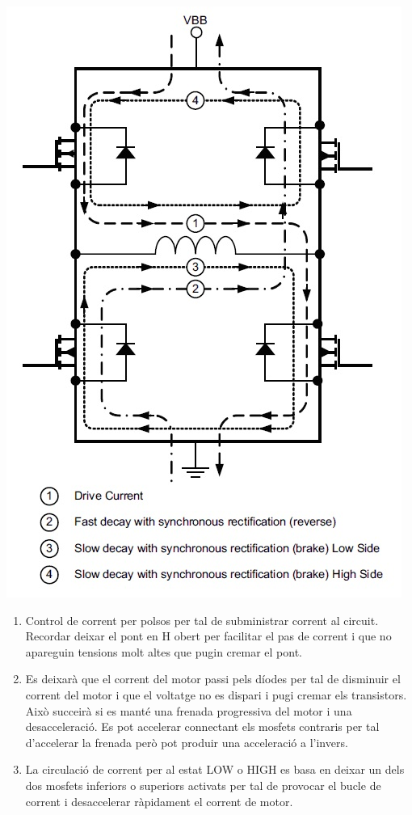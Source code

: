 \includegraphics[width=\textwidth]{Motors/Hsteps}
\bigskip

\begin{enumerate}
    \item Control de corrent per polsos per tal de subministrar corrent al circuit. Recordar deixar el pont en H obert per facilitar el pas de corrent i que no \newline apareguin tensions molt altes que pugin cremar el pont. 
    \item Es deixarà que el corrent del motor passi pels díodes per tal de disminuir el corrent del motor i que el voltatge no es dispari i pugi cremar els transistors. Això succeirà si es manté una frenada progressiva del motor i una desacceleració. Es pot accelerar connectant els mosfets contraris per tal d'accelerar la frenada però pot produir una acceleració a l'invers. 
    \item La circulació de corrent per al estat LOW o HIGH es basa en deixar un dels dos mosfets inferiors o superiors activats per tal de provocar el bucle de corrent i desaccelerar ràpidament el corrent de motor.  
\end{enumerate}

